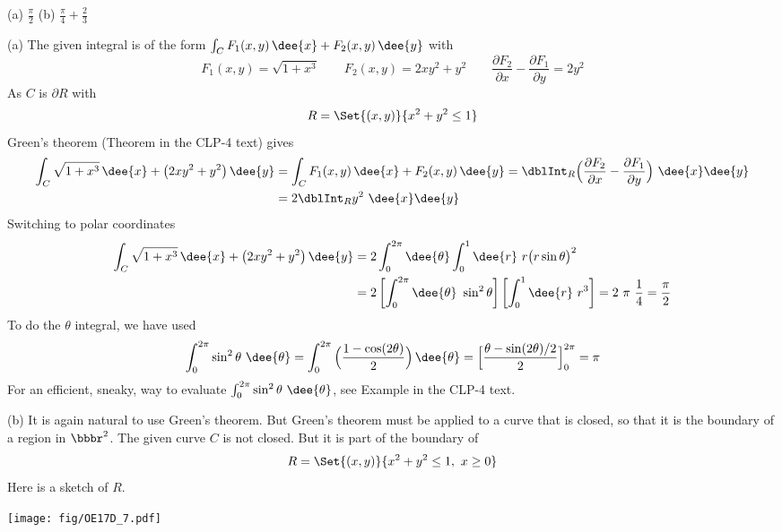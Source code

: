 
\begin{answer}
(a) $\frac{\pi}{2}$\qquad
(b) $\frac{\pi}{4}+\frac{2}{3}$
\end{answer}

\begin{solution} (a) The given integral is of the form
  $\int_C F_1(x,y)\,\dee{x}+F_2(x,y)\,\dee{y}$ with
\begin{equation*}
F_1(x,y) = \sqrt{1+x^3}\qquad
F_2(x,y) = 2xy^2 + y^2\qquad
\frac{\partial F_2}{\partial x} - \frac{\partial F_1}{\partial y} = 2y^2
\end{equation*}
As $C$ is $\partial R$ with
\begin{equation*}
R = \Set{(x,y)}{ x^2+y^2\le 1}
\end{equation*}
Green's theorem (Theorem  in the CLP-4 text)
gives
\begin{align*}
\int_C \sqrt{1+x^3}\,\dee{x} +\big(2xy^2 + y^2\big)\,\dee{y}
& = \int_C F_1(x,y)\,\dee{x}+F_2(x,y)\,\dee{y}
  = \dblInt_R \Big(\frac{\partial F_2}{\partial x}
           - \frac{\partial F_1}{\partial y}\Big)\ \dee{x}\dee{y} \\
&= 2 \dblInt_R y^2\ \dee{x}\dee{y}
\end{align*}
Switching to polar coordinates
\begin{align*}
\int_C \sqrt{1+x^3}\,\dee{x} +\big(2xy^2 + y^2\big)\,\dee{y}
&= 2\int_0^{2\pi}\dee{\theta} \int_0^1\dee{r}\
         r\big(r\sin\theta\big)^2 \\
&= 2\left[\int_0^{2\pi}\dee{\theta}\ \sin^2\theta\right]
   \left[\int_0^1\dee{r}\ r^3\right]
=2\ \pi\ \frac{1}{4}
=\frac{\pi}{2}
\end{align*}
To do the $\theta$ integral, we have used
\begin{align*}
\int_0^{2\pi} \sin^2 \theta\ \dee{\theta}
=\int_0^{2\pi} \Big(\frac{1-\cos(2\theta)}{2}\Big)\,\dee{\theta}
=\Big[\frac{\theta-\sin(2\theta)/2}{2} \Big]_0^{2\pi}
= \pi
\end{align*}
For an efficient, sneaky, way to evaluate
$\int_0^{2\pi} \sin^2 \theta\ \dee{\theta}$, see Example
 in the CLP-4 text.

(b) It is again natural to use Green's theorem.
But Green's theorem must be applied to a curve that is closed,
so that it is the boundary of a region in $\bbbr^2$. The given curve $C$
is not closed. But it is  part of the boundary of
\begin{equation*}
R = \Set{(x,y)}{x^2+y^2\le 1,\ x\ge 0}
\end{equation*}
Here is a sketch of $R$.
 \begin{center}
    \texttt{[image: fig/OE17D\_7.pdf]}
\end{center}


\end{solution}
